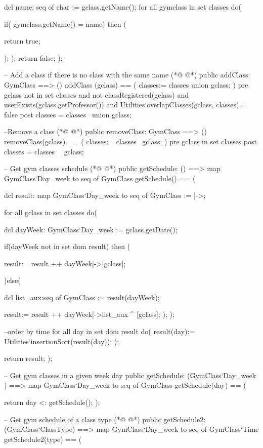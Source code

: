 \begin{vdmpp}[breaklines=true]
  dcl name: seq of char := gclass.getName();
  for all gymclass in set classes do(
  
   if( gymclass.getName() = name) then (
    
    return true;
    
   );
  );
  return false;
 );
 
 -- Add a class if there is no class with the same name
(*@
\label{addClass:161}
@*)
 public addClass: GymClass ==> ()
 addClass (gclass) == (
  classes:= classes union {gclass};
 )
 pre gclass not in set classes 
  and not classRegistered(gclass) 
  and userExists(gclass.getProfessor()) 
  and Utilities`overlapClasses(gclass, classes)= false
 post classes = classes~ union {gclass};
 
 
 --Remove a class 
(*@
\label{removeClass:173}
@*)
 public removeClass: GymClass ==> ()
 removeClass(gclass) == (
  classes:= classes \ {gclass};
 )
 pre gclass in set classes
 post classes = classes~ \ {gclass};
 
 
 -- Get gym classes schedule
(*@
\label{getSchedule:182}
@*)
 public getSchedule: () ==> map GymClass`Day_week to seq of GymClass
 getSchedule() == (
 
  dcl result: map GymClass`Day_week to seq of GymClass := {|->}; 
 
  for all gclass in set classes do(
   
   dcl dayWeek: GymClass`Day_week := gclass.getDate();
   
   if(dayWeek not in set dom result) then (
    
    result:= result ++ {dayWeek|->[gclass]};
    
   )else(
    
    dcl list_aux:seq of GymClass := result(dayWeek);
    
    result:= result ++ {dayWeek|->list_aux ^ [gclass]};
   );
  );
  
  --order by time 
  for all day in set dom result do( 
   result(day):= Utilities`insertionSort(result(day));
  );
  
  return result;
 );
 
 -- Get gym classes in a given week day
 public getSchedule: (GymClass`Day_week ) ==> map GymClass`Day_week to seq of GymClass
 getSchedule(day) == (
 
   return {day} <: getSchedule();
 );
 
 
 -- Get gym schedule of a class type
(*@
\label{getSchedule2:220}
@*)
 public getSchedule2: (GymClass`ClassType) ==> map GymClass`Day_week to seq of GymClass`Time
 getSchedule2(type) == (
 

\end{vdmpp}
